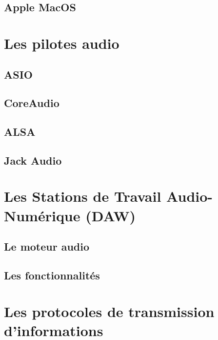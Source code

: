 \documentclass[
]{book}
\begin{document}
\hypertarget{apple-macos}{%
\subsection{Apple MacOS}\label{apple-macos}}

\hypertarget{les-pilotes-audio}{%
\section{Les pilotes audio}\label{les-pilotes-audio}}

\hypertarget{asio}{%
\subsection{ASIO}\label{asio}}

\hypertarget{coreaudio}{%
\subsection{CoreAudio}\label{coreaudio}}

\hypertarget{alsa}{%
\subsection{ALSA}\label{alsa}}

\hypertarget{jack-audio}{%
\subsection{Jack Audio}\label{jack-audio}}

\hypertarget{les-stations-de-travail-audio-numuxe9rique-daw}{%
\section{Les Stations de Travail Audio-Numérique (DAW)}\label{les-stations-de-travail-audio-numuxe9rique-daw}}

\hypertarget{le-moteur-audio}{%
\subsection{Le moteur audio}\label{le-moteur-audio}}

\hypertarget{les-fonctionnalituxe9s}{%
\subsection{Les fonctionnalités}\label{les-fonctionnalituxe9s}}

\hypertarget{les-protocoles-de-transmission-dinformations}{%
\section{Les protocoles de transmission d'informations}\label{les-protocoles-de-transmission-dinformations}}
\end{document}

